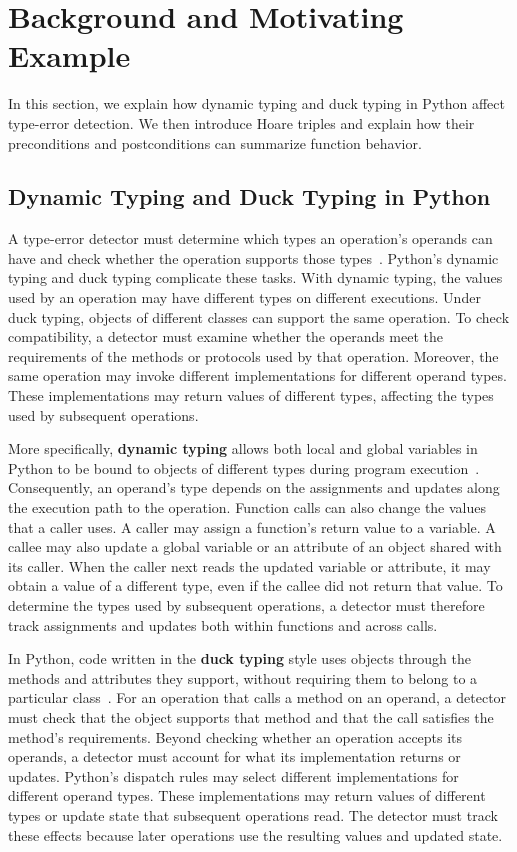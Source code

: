 \section{Background and Motivating Example}
\label{sec:background}

In this section, we explain how dynamic typing and duck typing in Python
affect type-error detection. We then introduce Hoare triples and explain
how their preconditions and postconditions can summarize function behavior.

\subsection{Dynamic Typing and Duck Typing in Python}

A type-error detector must determine which types an operation's operands
can have and check whether the operation supports those
types~\cite{oh2024pyinder}. Python's dynamic typing and duck typing
complicate these tasks. With dynamic typing, the values used by an
operation may have different types on different executions.
Under duck typing, objects of different classes can support the same
operation. To check compatibility, a detector must examine whether the
operands meet the requirements of the methods or protocols used by that
operation. Moreover, the same operation may invoke different
implementations for different operand types. These implementations may
return values of different types, affecting the types used by subsequent
operations.

More specifically, \textbf{dynamic typing} allows both local and global
variables in Python to be bound to objects of different
types during program execution~\cite{pythonExecutionModel,pythonDataModel}.
Consequently, an operand's type depends on the assignments and updates
along the execution path to the operation.
Function calls can also change the values that a caller uses. A caller may
assign a function's return value to a variable. A callee may also update a
global variable or an attribute of an object shared with its caller.
When the caller next reads the updated variable or attribute, it may
obtain a value of a different type, even if the callee did not return that
value. To determine the types used by subsequent operations, a detector
must therefore track assignments and updates both within functions and
across calls.

In Python, code written in the \textbf{duck typing} style uses objects
through the methods and attributes they support, without requiring them
to belong to a particular class~\cite{pythonGlossary}.
For an operation that calls a method on an operand, a detector must check
that the object supports that method and that the call satisfies the
method's requirements.
Beyond checking whether an operation accepts its operands, a detector
must account for what its implementation returns or updates. Python's
dispatch rules may select different implementations for different operand
types. These implementations may return values of different types or
update state that subsequent operations read. The detector must track
these effects because later operations use the resulting values and
updated state.

